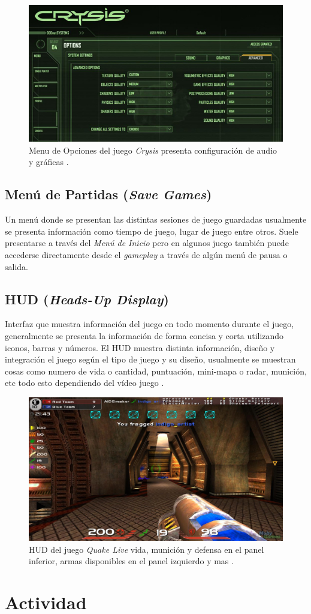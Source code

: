 \begin{figure}[H]
\centering
\includegraphics[width=0.95\linewidth]{semana8/crysis_opmenu.jpg} 
\caption{Menu de Opciones del juego \emph{Crysis} presenta configuración de audio y gráficas \cite{crysis}.}
\end{figure}

\subsection{Menú de Partidas (\emph{Save Games})}
Un menú donde se presentan las distintas sesiones de juego guardadas usualmente se presenta información como tiempo de juego, lugar de juego entre otros. Suele presentarse a través del \emph{Menú de Inicio} pero en algunos juego también puede accederse directamente desde el \emph{gameplay} a través de algún menú de pausa o salida.

\subsection{HUD (\emph{Heads-Up Display})}
Interfaz que muestra información del juego en todo momento durante el juego, generalmente se presenta la información de forma concisa y corta utilizando iconos, barras y números. El HUD muestra distinta información, diseño y integración el juego según el tipo de juego y su diseño, usualmente se muestran cosas como numero de vida o cantidad, puntuación, mini-mapa o radar, munición, etc todo esto dependiendo del vídeo juego \cite{huds}.

\begin{figure}[H]
\centering
\includegraphics[width=0.95\linewidth]{semana8/quake_live.jpg} 
\caption{HUD del juego \emph{Quake Live} vida, munición y defensa en el panel inferior, armas disponibles en el panel izquierdo y mas \cite{quake_live}.}
\end{figure}

\section{Actividad}
